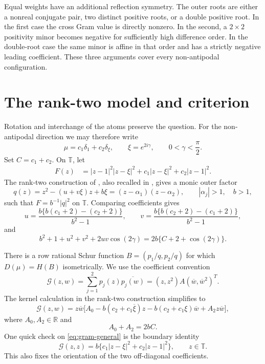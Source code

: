 \documentclass[11pt]{article}
\newcommand{\T}{\mathbb T}
\newcommand{\R}{\mathbb R}
\newcommand{\G}{\mathcal G}
\begin{document}
Equal weights have an additional reflection symmetry.  The outer roots
are either a nonreal conjugate pair, two distinct positive roots, or a
double positive root.  In the first case the cross Gram value is directly
nonzero.  In the second, a $2\times2$ positivity minor becomes negative
for sufficiently high difference order.  In the double-root case the same
minor is affine in that order and has a strictly negative leading
coefficient.  These three arguments cover every non-antipodal
configuration.

\section{The rank-two model and criterion}

Rotation and interchange of the atoms preserve the question.  For the
non-antipodal direction we may therefore write
\[
  \mu=c_1\delta_1+c_2\delta_\xi,\qquad
  \xi=e^{2i\gamma},\qquad 0<\gamma<\frac\pi2.
\]
Set $C=c_1+c_2$.  On $\T$, let
\begin{align*}
 F(z)&=|z-1|^2|z-\xi|^2+c_1|z-\xi|^2+c_2|z-1|^2.
\end{align*}
The rank-two construction of \cite{CGR}, also recalled in \cite{KPS},
gives a monic outer factor
\[
 q(z)=z^2-(u+v\xi)z+b\xi=(z-\alpha_1)(z-\alpha_2),
 \qquad |\alpha_j|>1,\quad b>1,
\]
such that $F=b^{-1}|q|^2$ on $\T$.  Comparing coefficients gives
\begin{equation}\label{eq:uv}
 u=\frac{b\{b(c_1+2)-(c_2+2)\}}{b^2-1},\qquad
 v=\frac{b\{b(c_2+2)-(c_1+2)\}}{b^2-1},
\end{equation}
and
\begin{equation}\label{eq:physical}
 b^2+1+u^2+v^2+2uv\cos(2\gamma)
 =2b\{C+2+\cos(2\gamma)\}.
\end{equation}

There is a row rational Schur function
$B=(p_1/q,p_2/q)$ for which $D(\mu)=H(B)$ isometrically.  We use the
coefficient convention
\[
 \G(z,w)=\sum_{j=1}^2p_j(z)\overline{p_j(w)}
        =(z,z^2)A(\overline w,\overline w^2)^T.
\]
The kernel calculation in the rank-two construction simplifies to
\begin{equation}\label{eq:gram-general}
\G(z,w)=z\overline w\bigl[A_0-b(c_2+c_1\overline\xi)z
 -b(c_2+c_1\xi)\overline w+A_2z\overline w\bigr],
\end{equation}
where $A_0,A_2\in\R$ and
\begin{equation}\label{eq:diag-sum}
 A_0+A_2=2bC.
\end{equation}
One quick check on \eqref{eq:gram-general} is the boundary identity
\begin{equation}\label{eq:boundary}
 \G(z,z)=b\{c_1|z-\xi|^2+c_2|z-1|^2\},\qquad z\in\T.
\end{equation}
This also fixes the orientation of the two off-diagonal coefficients.
\end{document}
